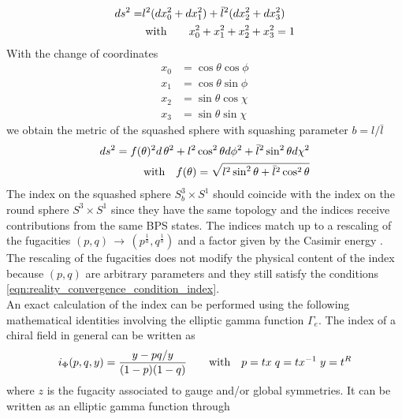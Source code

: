 \begin{align}
 d s^2 =& l^2 ( d x_0^2 + d x_1^2 ) + \bar{l}^2 ( d x_2^2 + d x_3^2) \\
 & \; \hbox{with} \qquad  x_0^2 + x_1^2 + x_2^2 + x_3^2 = 1
\end{align}
With the change of coordinates 
\begin{align}
x_0  & =  \cos \theta \cos \phi \\
x_1  & = \cos \theta \sin \phi \\
x_2  & = \sin \theta \cos \chi \\
x_3  & = \sin \theta \sin \chi 
\end{align}
we obtain the metric of the squashed sphere with squashing parameter 
$b = l/\bar{l}$
\begin{align}
 d s^2 = f(\theta)^2 d \,\theta^2 + l^2 \cos^2 \theta d \phi ^2 + \bar{l}^2 \sin^2 \theta d \chi^2 \\
\hbox{with} \quad f( \theta) = \sqrt{ l^2 \sin^2 \theta + \bar{l}^2 \cos^2 \theta}
\end{align}
The index on the squashed sphere $S_b^3 \times S^1$ should coincide with the index on the round sphere $S^3 \times S^1$ since they have the same topology and the indices receive contributions from the same BPS states.
The indices match up to a rescaling of the fugacities $(p,q) \, \rightarrow \, (p^{\frac{1}{a}}, q^{\frac{1}{b}})$ 
\cite{Agarwal:2012hs} and a factor given by the Casimir energy \cite{Assel:2015nca}.
The rescaling of the fugacities does not modify the physical content of the index because $(p,q)$ are arbitrary parameters and they still satisfy the conditions \eqref{eqn:reality_convergence_condition_index}.
\\
An exact calculation of the index can be performed using the following mathematical identities involving the elliptic gamma function $\Gamma_e$.
The index of a chiral field in general can be written as
\begin{equation}
i_{\Phi} (p,q,y) = \frac{y - pq/y}{(1-p)(1-q)} \qquad \hbox{with} \quad p=tx \; q=t x^{-1} \; y = t^R
\end{equation}
where $z$ is the fugacity associated to gauge and/or global symmetries.
It can be written as an elliptic gamma function through
